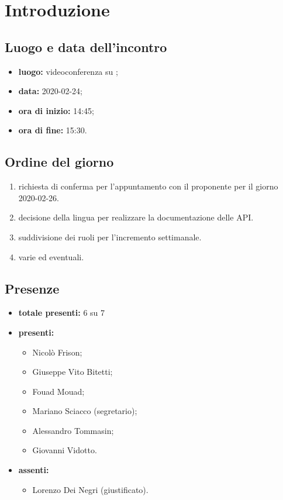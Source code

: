 \section*{Introduzione}

\subsection*{Luogo e data dell'incontro}
	\begin{itemize}
		\item \textbf{luogo:} videoconferenza su ;
		\item \textbf{data:} 2020-02-24;
		\item \textbf{ora di inizio:} 14:45;
		\item \textbf{ora di fine:} 15:30.
	\end{itemize}

\subsection*{Ordine del giorno}
	\begin{enumerate}
			\item richiesta di conferma per l'appuntamento con il proponente per il giorno 2020-02-26.
			\item decisione della lingua per realizzare la documentazione delle API.
			\item suddivisione dei ruoli per l'incremento settimanale.
  			\item varie ed eventuali.
	\end{enumerate}

\subsection*{Presenze}
	\begin{itemize}
		\item \textbf{totale presenti:} 6 su 7
		\item \textbf{presenti: }
			\begin{itemize}			
				\item Nicolò Frison;
				\item Giuseppe Vito Bitetti;
				\item Fouad Mouad;
				\item Mariano Sciacco (segretario);
				\item Alessandro Tommasin;
				\item Giovanni Vidotto.
			\end{itemize}
		\item \textbf{assenti: } 
			\begin{itemize}	
				\item Lorenzo Dei Negri (giustificato).
			\end{itemize}
	\end{itemize}


